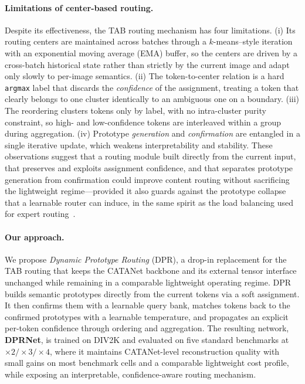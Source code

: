 \paragraph{Limitations of center-based routing.}
Despite its effectiveness, the TAB routing mechanism has four limitations.
(i) Its routing centers are maintained across batches through a $k$-means--style
iteration with an exponential moving average (EMA) buffer, so the centers are
driven by a cross-batch historical state rather than strictly by the current
image and adapt only slowly to per-image semantics. (ii) The token-to-center
relation is a hard \texttt{argmax} label that discards the \emph{confidence} of
the assignment, treating a token that clearly belongs to one cluster identically
to an ambiguous one on a boundary. (iii) The reordering clusters tokens only by
label, with no intra-cluster purity constraint, so high- and low-confidence tokens
are interleaved within a group during aggregation. (iv) Prototype \emph{generation}
and \emph{confirmation} are entangled in a single iterative update, which weakens
interpretability and stability. These observations suggest that a routing module
built directly from the current input, that preserves and exploits assignment
confidence, and that separates prototype generation from confirmation could
improve content routing without sacrificing the lightweight regime---provided it
also guards against the prototype collapse that a learnable router can induce, in
the same spirit as the load balancing used for expert routing~\cite{he2026mordasr}.

\paragraph{Our approach.}
We propose \emph{Dynamic Prototype Routing} (DPR), a drop-in replacement for the
TAB routing that keeps the CATANet backbone and its external tensor interface
unchanged while remaining in a comparable lightweight operating regime. DPR builds
semantic prototypes directly from the current tokens via a soft assignment. It then
confirms them with a learnable query bank, matches tokens back to the confirmed
prototypes with a learnable temperature, and propagates an explicit per-token
confidence through ordering and aggregation. The resulting network,
\textbf{DPRNet}, is trained on DIV2K and evaluated on five standard benchmarks at
$\times2/\times3/\times4$, where it maintains CATANet-level reconstruction quality
with small gains on most benchmark cells and a comparable lightweight cost profile,
while exposing an interpretable, confidence-aware routing
mechanism.

